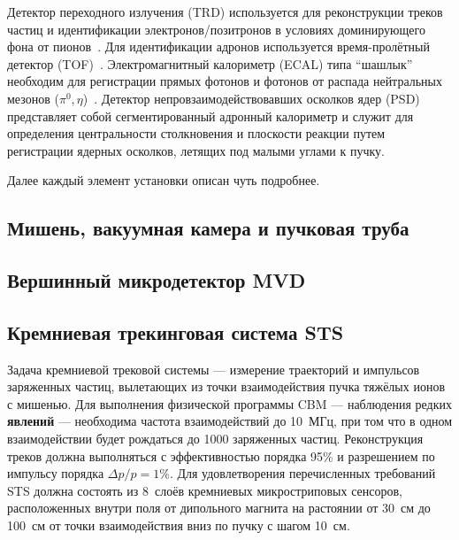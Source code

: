 Детектор переходного излучения (TRD) используется для реконструкции треков частиц и идентификации электронов/позитронов в условиях доминирующего фона от пионов~\cite{TRD}. Для идентификации адронов используется время-пролётный детектор (TOF)~\cite{TDR_TOF}. Электромагнитный калориметр (ECAL) типа ``шашлык'' необходим для регистрации прямых фотонов и фотонов от распада нейтральных мезонов ($ \pi^{0}, \eta $)~\cite{ECAL_KOROLKO}. Детектор непровзаимодействовавших осколков ядер (PSD)~\cite{TDR_PSD} представляет собой сегментированный адронный калориметр и служит для определения центральности столкновения и плоскости реакции путем регистрации ядерных осколков, летящих под малыми углами к пучку.

Далее каждый элемент установки описан чуть подробнее.

\subsection{Мишень, вакуумная камера и пучковая труба}\label{sec:secVacChamberPipe}

\subsection{Вершинный микродетектор MVD}\label{sec:secMVD}

\subsection{Кремниевая трекинговая система STS}\label{sec:secSTS}

Задача кремниевой трековой системы --- измерение траекторий и импульсов заряженных частиц, вылетающих из точки взаимодействия пучка тяжёлых ионов с мишенью. Для выполнения физической программы CBM --- наблюдения редких \textbf{явлений} --- необходима частота взаимодействий до 10~МГц, при том что в одном взаимодействии будет рождаться до 1000 заряженных частиц. Реконструкция треков должна выполняться с эффективностью порядка 95\% и разрешением по импульсу порядка $\Delta p / p = 1\%$. Для удовлетворения перечисленных требований STS должна состоять из 8~слоёв кремниевых микростриповых сенсоров, расположенных внутри поля от дипольного магнита на растоянии от 30~см до 100~см от точки взаимодействия вниз по пучку с шагом 10~см.

